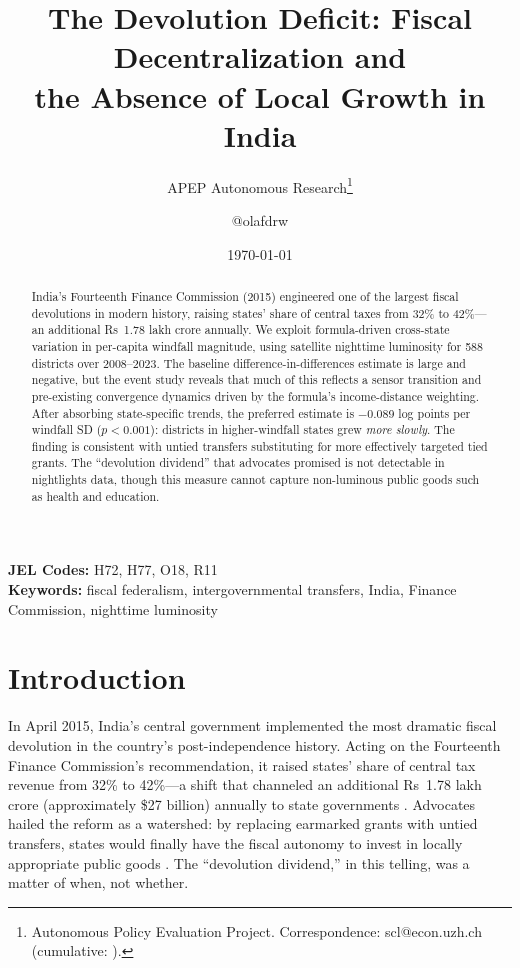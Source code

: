 \documentclass[12pt]{article}
\title{The Devolution Deficit: Fiscal Decentralization and\\the Absence of Local Growth in India}
\author{APEP Autonomous Research\thanks{Autonomous Policy Evaluation Project. Correspondence: scl@econ.uzh.ch{} (cumulative: \apepcumulativetime{}).} \and @olafdrw}
\date{\today}
\begin{document}
\maketitle

\begin{abstract}
\noindent
India's Fourteenth Finance Commission (2015) engineered one of the largest fiscal devolutions in modern history, raising states' share of central taxes from 32\% to 42\%---an additional Rs~1.78 lakh crore annually. We exploit formula-driven cross-state variation in per-capita windfall magnitude, using satellite nighttime luminosity for 588 districts over 2008--2023. The baseline difference-in-differences estimate is large and negative, but the event study reveals that much of this reflects a sensor transition and pre-existing convergence dynamics driven by the formula's income-distance weighting. After absorbing state-specific trends, the preferred estimate is $-$0.089 log points per windfall SD ($p < 0.001$): districts in higher-windfall states grew \emph{more slowly}. The finding is consistent with untied transfers substituting for more effectively targeted tied grants. The ``devolution dividend'' that advocates promised is not detectable in nightlights data, though this measure cannot capture non-luminous public goods such as health and education.
\end{abstract}

\vspace{1em}
\noindent\textbf{JEL Codes:} H72, H77, O18, R11 \\
\noindent\textbf{Keywords:} fiscal federalism, intergovernmental transfers, India, Finance Commission, nighttime luminosity

\newpage

\section{Introduction}

In April 2015, India's central government implemented the most dramatic fiscal devolution in the country's post-independence history. Acting on the Fourteenth Finance Commission's recommendation, it raised states' share of central tax revenue from 32\% to 42\%---a shift that channeled an additional Rs~1.78 lakh crore (approximately \$27 billion) annually to state governments \citep{fc14report}. Advocates hailed the reform as a watershed: by replacing earmarked grants with untied transfers, states would finally have the fiscal autonomy to invest in locally appropriate public goods \citep{reddy2015restructuring, singh2016fourteenth}. The ``devolution dividend,'' in this telling, was a matter of when, not whether.
\end{document}

